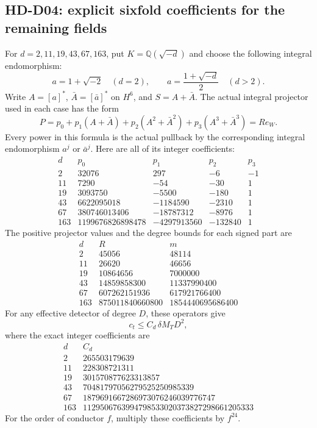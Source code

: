 \subsection{HD-D04: explicit sixfold coefficients for the remaining fields}

For \(d=2,11,19,43,67,163\), put \(K=\mathbb Q(\sqrt{-d})\) and
choose the following integral endomorphism:
\[
 a=1+\sqrt{-2}\quad(d=2),\qquad
 a=\frac{1+\sqrt{-d}}2\quad(d>2).
\]
Write \(A=[a]^*\), \(\bar A=[\bar a]^*\) on \(H^6\), and
\(S=A+\bar A\). The actual integral projector used in each
case has the form
\[
 P=p_0+p_1(A+\bar A)+p_2(A^2+\bar A^2)+p_3(A^3+\bar A^3)
   =R e_W.                                               \tag{D04.1}
\]
Every power in this formula is the actual pullback by the
corresponding integral endomorphism \(a^j\) or \(\bar a^j\).
Here are all of its integer coefficients:
\[
\begin{array}{c|r|r|r|r}
d&p_0&p_1&p_2&p_3\\\hline
2&32076&297&-6&-1\\
11&7290&-54&-30&1\\
19&3093750&-5500&-180&1\\
43&6622095018&-1184590&-2310&1\\
67&380746013406&-18787312&-8976&1\\
163&1199676826898478&-4297913560&-132840&1
\end{array}
\]
The positive projector values and the degree bounds for each
signed part are
\[
\begin{array}{c|r|r}
d&R&m\\\hline
2&45056&48114\\
11&26620&46656\\
19&10864656&7000000\\
43&14859858300&11337990400\\
67&607262151936&617921766400\\
163&875011840660800&1854440695686400
\end{array}
\]
For any effective detector of degree \(D\), these operators give
\[
 \boxed{c_t\le C_d\,\delta M_TD^2,}                       \tag{D04.2}
\]
where the exact integer coefficients are
\[
\begin{array}{c|r}
d&C_d\\\hline
2&265503179639\\
11&228308721311\\
19&301570877623313857\\
43&70481797056279525250985339\\
67&1879691667286973076246039776747\\
163&1129506763994798533020373827298661205333
\end{array}
\]
For the order of conductor \(f\), multiply these coefficients
by \(f^{24}\).

